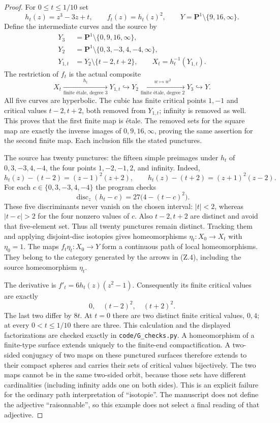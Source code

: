 \begin{proof}
For $0\leq t\leq1/10$ set
\[
 h_t(z)=z^3-3z+t,\qquad f_t(z)=h_t(z)^2,
 \qquad Y=\mathbf P^1\setminus\{9,16,\infty\}.
\]
Define the intermediate curves and the source by
\[
 \begin{aligned}
 Y_3&=\mathbf P^1\setminus\{0,9,16,\infty\},\\
 Y_2&=\mathbf P^1\setminus\{0,3,-3,4,-4,\infty\},\\
 Y_{1,t}&=Y_2\setminus\{t-2,t+2\},\qquad
 X_t=h_t^{-1}(Y_{1,t}).
 \end{aligned}
\]
The restriction of $f_t$ is the actual composite
\[
 X_t\xrightarrow[\text{finite \'etale, degree }3]{h_t}Y_{1,t}
 \hookrightarrow Y_2
 \xrightarrow[\text{finite \'etale, degree }2]{w\mapsto w^2}Y_3
 \hookrightarrow Y.                                      \tag{Z.4}
\]
All five curves are hyperbolic. The cubic has finite critical points
$1,-1$ and critical values $t-2,t+2$, both removed from $Y_{1,t}$;
infinity is removed as well. This proves that the first finite
map is \'etale. The removed sets for the square map are exactly
the inverse images of $0,9,16,\infty$, proving the same assertion
for the second finite map. Each inclusion fills the stated punctures.

The source has twenty punctures: the fifteen simple preimages under
$h_t$ of $0,3,-3,4,-4$, the four points $1,-2,-1,2$, and infinity.
Indeed,
\[
 h_t(z)-(t-2)=(z-1)^2(z+2),\qquad
 h_t(z)-(t+2)=(z+1)^2(z-2).
\]
For each $c\in\{0,3,-3,4,-4\}$ the program checks
\[
 \operatorname{disc}_z(h_t-c)=27\bigl(4-(t-c)^2\bigr).
\]
These five discriminants never vanish on the chosen interval:
$|t|<2$, whereas $|t-c|>2$ for the four nonzero values of $c$.
Also $t-2,t+2$ are distinct and avoid that five-element set.
Thus all twenty punctures remain distinct. Tracking them and
applying disjoint-disc isotopies gives homeomorphisms
$\eta_t:X_0\to X_t$ with $\eta_0=1$. The maps
$f_t\eta_t:X_0\to Y$ form a continuous path of local
homeomorphisms. They belong to the category generated by the
arrows in (Z.4), including the source homeomorphism $\eta_t$.

The derivative is $f'_t=6h_t(z)(z^2-1)$. Consequently its finite
critical values are exactly
\[
 0,\quad(t-2)^2,\quad(t+2)^2.
\]
The last two differ by $8t$. At $t=0$ there are two distinct
finite critical values, $0,4$; at every $0<t\leq1/10$ there
are three. This calculation and the displayed factorizations
are checked exactly in \texttt{code/G\_checks.py}.
A homeomorphism of a finite-type surface extends uniquely to the
finite-end compactification. A two-sided conjugacy of two maps on
these punctured surfaces therefore extends to their compact spheres
and carries their sets of critical values bijectively. The two maps
cannot be in the same two-sided orbit, because those sets have
different cardinalities (including infinity adds one on both sides).
This is an explicit failure for the ordinary path interpretation of
``isotopie''. The manuscript does not define the adjective
``raisonnable'', so this example does not select a final reading of
that adjective.


\end{proof}
